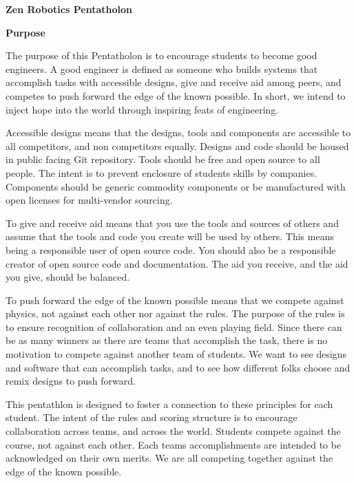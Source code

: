 \documentclass{article}
\begin{document}
	
{\huge \textbf{Zen Robotics Pentatholon}}

\vspace{1cm}


\vspace{1cm}

{\huge \textbf{Purpose}}
\vspace{1cm}

The purpose of this Pentatholon is to encourage students to become good engineers. A good engineer is defined as someone who builds systems that accomplish tasks with accessible designs, give and receive aid among peers, and competes to push forward the edge of the known possible. In short, we intend to inject hope into the world through inspiring feats of engineering.

Accessible designs means that the designs, tools and components are accessible to all competitors, and non competitors equally. Designs and code should be housed in public facing Git repository. Tools should be free and open source to all people. The intent is to prevent enclosure of students skills by companies.  Components should be generic commodity components or be manufactured with open licenses for multi-vendor sourcing.  

To give and receive aid means that you use the tools and sources of others and assume that the tools and code you create will be used by others. This means being a responsible user of open source code. You should also be a responsible creator of open source code and documentation. The aid you receive, and the aid you give, should be  balanced. 

To push forward the edge of the known possible means that we compete against physics, not against each other nor against the rules. The purpose of the rules is to ensure recognition of collaboration and an even playing field. Since there can be as many winners as there are teams that accomplish the task, there is no motivation to compete against another team of students. We want to see designs and software that can accomplish tasks, and to see how different folks choose and remix designs to push forward. 

  
This pentathlon is designed to foster a connection to these principles for each student. The intent of the rules and scoring structure is to encourage collaboration across teams, and across the world. Students compete against the course, not against each other. Each teams accomplishments are intended to be acknowledged on their own merits. We are all competing together against the edge of the known possible.
\pagebreak
\end{document}
